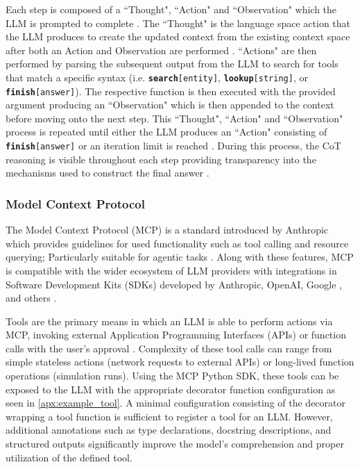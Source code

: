 Each step is composed of a ``Thought", ``Action" and ``Observation" which the
LLM is prompted to complete \cite{yao_react_2022}. The ``Thought" is the
language space action that the LLM produces to create the updated context from
the existing context space after both an Action and Observation are performed
\cite{yao_react_2022}. ``Actions" are then performed by parsing the subsequent
output from the LLM to search for tools that match a specific syntax (i.e.
\texttt{\textbf{search}[entity]}, \texttt{\textbf{lookup}[string]}, or
\texttt{\textbf{finish}[answer]}). The respective function is then executed with
the provided argument producing an ``Observation" which is then appended to the
context before moving onto the next step. This ``Thought", ``Action" and
``Observation" process is repeated until either the LLM produces an ``Action"
consisting of \texttt{\textbf{finish}[answer]} or an iteration limit is reached
\cite{yao_react_2022}. During this process, the CoT reasoning is visible
throughout each step providing transparency into the mechanisms used to
construct the final answer \cite{yao_react_2022}.

\subsubsection{Model Context Protocol}
The Model Context Protocol (MCP) is a standard introduced by Anthropic which
provides guidelines for used functionality such as tool calling and resource
querying; Particularly suitable for agentic tasks
\cite{anthropic_introducing_2024, ehtesham_survey_2025, hou_model_2025}. Along
with these features, MCP is compatible with the wider ecosystem of LLM providers
with integrations in Software Development Kits (SDKs) developed by Anthropic,
OpenAI, Google \cite{hamsa_buvaraghan_mcp_2025}, and others
\cite{hou_model_2025}.

Tools are the primary means in which an LLM is able to perform actions via MCP,
invoking external Application Programming Interfaces (APIs) or function calls
with the user's approval \cite{hou_model_2025, ehtesham_survey_2025}. Complexity
of these tool calls can range from simple stateless actions (network requests to
external APIs) or long-lived function operations (simulation runs). Using the
MCP Python SDK, these tools can be exposed to the LLM with the appropriate
decorator function configuration as seen in \ref{apx:example_tool}. A minimal
configuration consisting of the decorator wrapping a tool function is sufficient
to register a tool for an LLM. However, additional annotations such as type
declarations, docstring descriptions, and structured outputs significantly
improve the model's comprehension and proper utilization of the defined tool.

